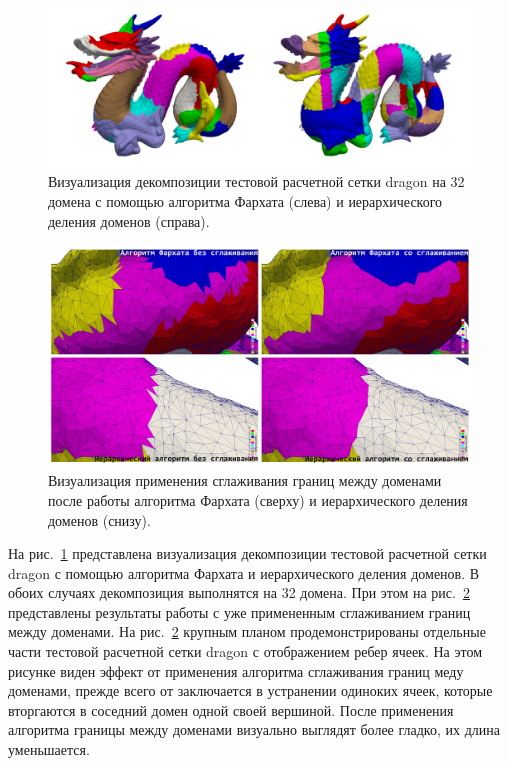 \begin{figure}[ht]
\centering
\includegraphics[width=1.0\textwidth]{fig/par_dragon_decomp.pdf}
\singlespacing
{}\caption{Визуализация декомпозиции тестовой расчетной сетки dragon на 32 домена с помощью алгоритма Фархата (слева) и иерархического деления доменов (справа).}
\label{fig:text_2_smooth_decomp}
\end{figure}

\begin{figure}[!ht]
\centering
\includegraphics[width=1.0\textwidth]{fig/par_dragon_decomp2.pdf}
\singlespacing
{}\caption{Визуализация применения сглаживания границ между доменами после работы алгоритма Фархата (сверху) и иерархического деления доменов (снизу).}
\label{fig:text_2_smooth_decomp2}
\end{figure}

На рис.~\ref{fig:text_2_smooth_decomp} представлена визуализация декомпозиции тестовой расчетной сетки dragon \cite{StanfordModels} с помощью алгоритма Фархата и иерархического деления доменов.
В обоих случаях декомпозиция выполнятся на 32 домена.
При этом на рис.~\ref{fig:text_2_smooth_decomp2} представлены результаты работы с уже примененным сглаживанием границ между доменами.
На рис.~\ref{fig:text_2_smooth_decomp2} крупным планом продемонстрированы отдельные части тестовой расчетной сетки dragon с отображением ребер ячеек.
На этом рисунке виден эффект от применения алгоритма сглаживания границ меду доменами, прежде всего от заключается в устранении одиноких ячеек, которые вторгаются в соседний домен одной своей вершиной.
После применения алгоритма границы между доменами визуально выглядят более гладко, их длина уменьшается.

